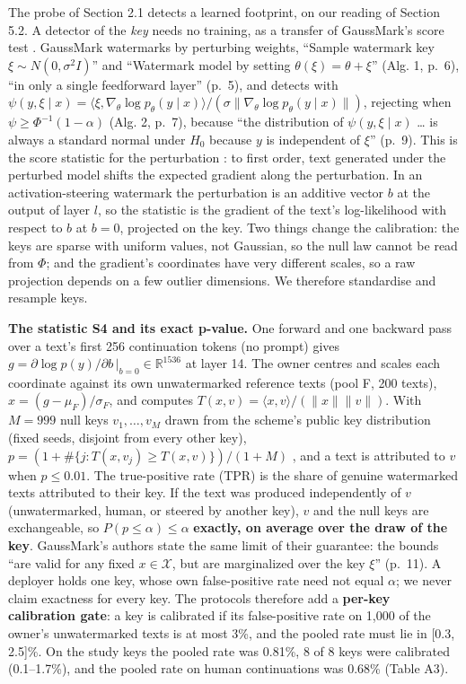 \documentclass[11pt,letterpaper]{article}
\begin{document}
The probe of Section 2.1 detects a learned footprint, on our reading of Section 5.2. A detector of the \emph{key} needs no training, as a transfer of GaussMark's score test \citep{block2025gaussmark}. GaussMark watermarks by perturbing weights, ``Sample watermark key \(\xi \sim N(0, \sigma^2 I)\)'' and ``Watermark model by setting \(\theta(\xi) = \theta + \xi\)'' (Alg. 1, p.~6), ``in only a single feedforward layer'' (p.~5), and detects with \(\psi(y, \xi \mid x) = \langle \xi, \nabla_\theta \log p_\theta(y \mid x) \rangle / (\sigma \lVert \nabla_\theta \log p_\theta(y \mid x) \rVert)\), rejecting when \(\psi \geq \Phi^{-1}(1 - \alpha)\) (Alg. 2, p.~7), because ``the distribution of \(\psi(y, \xi \mid x)\) \ldots{} is always a standard normal under \(H_0\) because \(y\) is independent of \(\xi\)'' (p.~9). This is the score statistic for the perturbation \citep{rao1948score}: to first order, text generated under the perturbed model shifts the expected gradient along the perturbation. In an activation-steering watermark the perturbation is an additive vector \(b\) at the output of layer \(l\), so the statistic is the gradient of the text's log-likelihood with respect to \(b\) at \(b = 0\), projected on the key. Two things change the calibration: the keys are sparse with uniform values, not Gaussian, so the null law cannot be read from \(\Phi\); and the gradient's coordinates have very different scales, so a raw projection depends on a few outlier dimensions. We therefore standardise and resample keys.

\textbf{The statistic S4 and its exact p-value.} One forward and one backward pass over a text's first 256 continuation tokens (no prompt) gives \(g = \partial \log p(y) / \partial b \,|_{b = 0} \in \mathbb{R}^{1536}\) at layer 14. The owner centres and scales each coordinate against its own unwatermarked reference texts (pool F, 200 texts), \(x = (g - \mu_F) / \sigma_F\), and computes \(T(x, v) = \langle x, v \rangle / (\lVert x \rVert \lVert v \rVert)\). With \(M = 999\) null keys \(v_1, \dots, v_M\) drawn from the scheme's public key distribution (fixed seeds, disjoint from every other key), \(p = (1 + \#\{j : T(x, v_j) \geq T(x, v)\}) / (1 + M)\) \citep{phipson2010permutation}, and a text is attributed to \(v\) when \(p \leq 0.01\). The true-positive rate (TPR) is the share of genuine watermarked texts attributed to their key. If the text was produced independently of \(v\) (unwatermarked, human, or steered by another key), \(v\) and the null keys are exchangeable, so \(P(p \leq \alpha) \leq \alpha\) \textbf{exactly, on average over the draw of the key}. GaussMark's authors state the same limit of their guarantee: the bounds ``are valid for any fixed \(x \in \mathcal{X}\), but are marginalized over the key \(\xi\)'' (p.~11). A deployer holds one key, whose own false-positive rate need not equal \(\alpha\); we never claim exactness for every key. The protocols therefore add a \textbf{per-key calibration gate}: a key is calibrated if its false-positive rate on 1,000 of the owner's unwatermarked texts is at most 3\%, and the pooled rate must lie in {[}0.3, 2.5{]}\%. On the study keys the pooled rate was 0.81\%, 8 of 8 keys were calibrated (0.1--1.7\%), and the pooled rate on human continuations was 0.68\% (Table A3).
\end{document}
